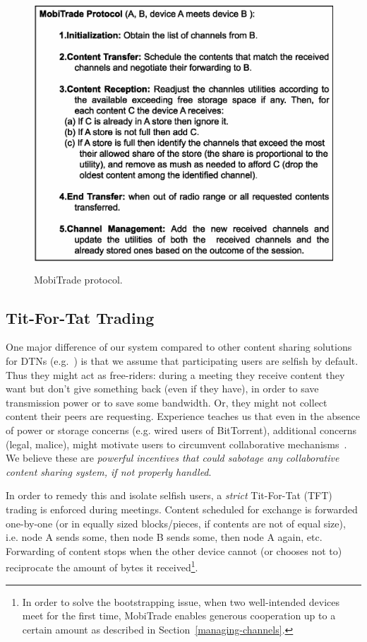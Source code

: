 \begin{figure}[!h]
\centering
\includegraphics[width=4.5in,height=4in]{Chapitre5/MobiTrade-Protocol.eps}
\caption{MobiTrade protocol.}
\label{protocol}
\end{figure}

\subsection{Tit-For-Tat Trading}
\label{contents-trading-scheduling}

One major difference of our system compared to other content sharing solutions for DTNs (e.g.~\cite{May07wirelessopportunistic,ContentPlace,TACODTN}) is that we assume that participating users are selfish by default. Thus they might act as free-riders: during a meeting they receive content they want but don't give something back (even if they have), in order to save transmission power or to save some bandwidth. Or, they might not collect content their peers are requesting. Experience teaches us that even in the absence of power or storage concerns (e.g. wired users of BitTorrent), additional concerns (legal, malice), might motivate users to circumvent collaborative mechanisms~\cite{BitThief}. We believe these are \emph{powerful incentives that could sabotage any collaborative content sharing system, if not properly handled}.

In order to remedy this and isolate selfish users, a \emph{strict} Tit-For-Tat (TFT) trading is enforced during meetings. Content scheduled for exchange is forwarded one-by-one (or in equally sized blocks/pieces, if contents are not of equal size), i.e. node A sends some, then node B sends some, then node A again, etc. Forwarding of content stops when the other device cannot (or chooses not to) reciprocate the amount of bytes it received\footnote{In order to solve the bootstrapping issue, when two well-intended devices meet for the first time, MobiTrade enables generous cooperation up to a certain amount as described in Section~\ref{managing-channels}.}. 

